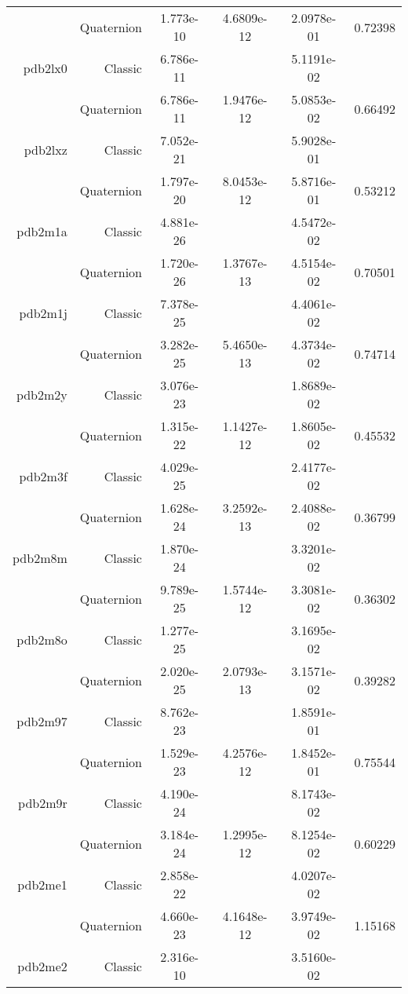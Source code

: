 \begin{xltabular}{\textwidth}{r|rS[table-format=1.3e+2]S[table-format=1.4e+2]S[table-format=1.4e+2]S[table-format=-1.5]}
& Quaternion & 1.773e-10 & 4.6809e-12 & 2.0978e-01 & 0.72398\\  \addlinespace
pdb2lx0 & Classic & 6.786e-11 &  & 5.1191e-02 & \\
& Quaternion & 6.786e-11 & 1.9476e-12 & 5.0853e-02 & 0.66492\\  \addlinespace
pdb2lxz & Classic & 7.052e-21 &  & 5.9028e-01 & \\
& Quaternion & 1.797e-20 & 8.0453e-12 & 5.8716e-01 & 0.53212\\  \addlinespace
pdb2m1a & Classic & 4.881e-26 &  & 4.5472e-02 & \\
& Quaternion & 1.720e-26 & 1.3767e-13 & 4.5154e-02 & 0.70501\\  \addlinespace
pdb2m1j & Classic & 7.378e-25 &  & 4.4061e-02 & \\
& Quaternion & 3.282e-25 & 5.4650e-13 & 4.3734e-02 & 0.74714\\  \addlinespace
pdb2m2y & Classic & 3.076e-23 &  & 1.8689e-02 & \\
& Quaternion & 1.315e-22 & 1.1427e-12 & 1.8605e-02 & 0.45532\\  \addlinespace
pdb2m3f & Classic & 4.029e-25 &  & 2.4177e-02 & \\
& Quaternion & 1.628e-24 & 3.2592e-13 & 2.4088e-02 & 0.36799\\  \addlinespace
pdb2m8m & Classic & 1.870e-24 &  & 3.3201e-02 & \\
& Quaternion & 9.789e-25 & 1.5744e-12 & 3.3081e-02 & 0.36302\\  \addlinespace
pdb2m8o & Classic & 1.277e-25 &  & 3.1695e-02 & \\
& Quaternion & 2.020e-25 & 2.0793e-13 & 3.1571e-02 & 0.39282\\  \addlinespace
pdb2m97 & Classic & 8.762e-23 &  & 1.8591e-01 & \\
& Quaternion & 1.529e-23 & 4.2576e-12 & 1.8452e-01 & 0.75544\\  \addlinespace
pdb2m9r & Classic & 4.190e-24 &  & 8.1743e-02 & \\
& Quaternion & 3.184e-24 & 1.2995e-12 & 8.1254e-02 & 0.60229\\  \addlinespace
pdb2me1 & Classic & 2.858e-22 &  & 4.0207e-02 & \\
& Quaternion & 4.660e-23 & 4.1648e-12 & 3.9749e-02 & 1.15168\\  \addlinespace
pdb2me2 & Classic & 2.316e-10 &  & 3.5160e-02 & \\

\end{xltabular}
